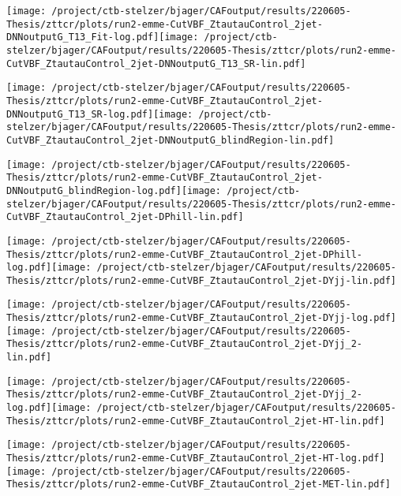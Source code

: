\documentclass{article}
\begin{document}
\texttt{[image: /project/ctb-stelzer/bjager/CAFoutput/results/220605-Thesis/zttcr/plots/run2-emme-CutVBF\_ZtautauControl\_2jet-DNNoutputG\_T13\_Fit-log.pdf]}\texttt{[image: /project/ctb-stelzer/bjager/CAFoutput/results/220605-Thesis/zttcr/plots/run2-emme-CutVBF\_ZtautauControl\_2jet-DNNoutputG\_T13\_SR-lin.pdf]}

\texttt{[image: /project/ctb-stelzer/bjager/CAFoutput/results/220605-Thesis/zttcr/plots/run2-emme-CutVBF\_ZtautauControl\_2jet-DNNoutputG\_T13\_SR-log.pdf]}\texttt{[image: /project/ctb-stelzer/bjager/CAFoutput/results/220605-Thesis/zttcr/plots/run2-emme-CutVBF\_ZtautauControl\_2jet-DNNoutputG\_blindRegion-lin.pdf]}

\texttt{[image: /project/ctb-stelzer/bjager/CAFoutput/results/220605-Thesis/zttcr/plots/run2-emme-CutVBF\_ZtautauControl\_2jet-DNNoutputG\_blindRegion-log.pdf]}\texttt{[image: /project/ctb-stelzer/bjager/CAFoutput/results/220605-Thesis/zttcr/plots/run2-emme-CutVBF\_ZtautauControl\_2jet-DPhill-lin.pdf]}

\texttt{[image: /project/ctb-stelzer/bjager/CAFoutput/results/220605-Thesis/zttcr/plots/run2-emme-CutVBF\_ZtautauControl\_2jet-DPhill-log.pdf]}\texttt{[image: /project/ctb-stelzer/bjager/CAFoutput/results/220605-Thesis/zttcr/plots/run2-emme-CutVBF\_ZtautauControl\_2jet-DYjj-lin.pdf]}

\texttt{[image: /project/ctb-stelzer/bjager/CAFoutput/results/220605-Thesis/zttcr/plots/run2-emme-CutVBF\_ZtautauControl\_2jet-DYjj-log.pdf]}\texttt{[image: /project/ctb-stelzer/bjager/CAFoutput/results/220605-Thesis/zttcr/plots/run2-emme-CutVBF\_ZtautauControl\_2jet-DYjj\_2-lin.pdf]}

\texttt{[image: /project/ctb-stelzer/bjager/CAFoutput/results/220605-Thesis/zttcr/plots/run2-emme-CutVBF\_ZtautauControl\_2jet-DYjj\_2-log.pdf]}\texttt{[image: /project/ctb-stelzer/bjager/CAFoutput/results/220605-Thesis/zttcr/plots/run2-emme-CutVBF\_ZtautauControl\_2jet-HT-lin.pdf]}

\texttt{[image: /project/ctb-stelzer/bjager/CAFoutput/results/220605-Thesis/zttcr/plots/run2-emme-CutVBF\_ZtautauControl\_2jet-HT-log.pdf]}\texttt{[image: /project/ctb-stelzer/bjager/CAFoutput/results/220605-Thesis/zttcr/plots/run2-emme-CutVBF\_ZtautauControl\_2jet-MET-lin.pdf]}
\end{document}
